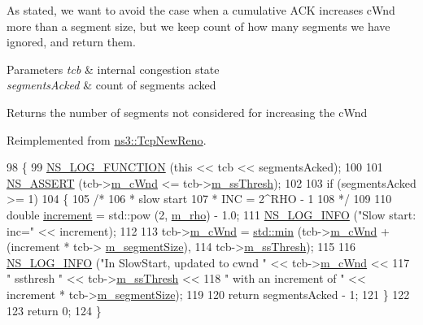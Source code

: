 As stated, we want to avoid the case when a cumulative A\+CK increases c\+Wnd more than a segment size, but we keep count of how many segments we have ignored, and return them.


\begin{DoxyParams}{Parameters}
{\em tcb} & internal congestion state \\
\hline
{\em segments\+Acked} & count of segments acked \\
\hline
\end{DoxyParams}
\begin{DoxyReturn}{Returns}
the number of segments not considered for increasing the c\+Wnd 
\end{DoxyReturn}


Reimplemented from \hyperlink{classns3_1_1TcpNewReno_a1cf5fd9585eb3b745727f4f5beae0706}{ns3\+::\+Tcp\+New\+Reno}.


\begin{DoxyCode}
98 \{
99   \hyperlink{log-macros-disabled_8h_a90b90d5bad1f39cb1b64923ea94c0761}{NS\_LOG\_FUNCTION} (\textcolor{keyword}{this} << tcb << segmentsAcked);
100 
101   \hyperlink{assert_8h_a6dccdb0de9b252f60088ce281c49d052}{NS\_ASSERT} (tcb->\hyperlink{classns3_1_1TcpSocketState_a7cd3d2156a483c1db436097477a0fd7f}{m\_cWnd} <= tcb->\hyperlink{classns3_1_1TcpSocketState_aec003b6dba9d269bfb1036c7652ffbd6}{m\_ssThresh});
102 
103   \textcolor{keywordflow}{if} (segmentsAcked >= 1)
104     \{
105       \textcolor{comment}{/*}
106 \textcolor{comment}{       * slow start}
107 \textcolor{comment}{       * INC = 2^RHO - 1}
108 \textcolor{comment}{       */}
109 
110       \textcolor{keywordtype}{double} \hyperlink{mmwave-amc-test2_8cc_ac504dff76b24ab9f15536c51aec9fbbb}{increment} = std::pow (2, \hyperlink{classns3_1_1TcpHybla_a89505ef8588ef3cbe7d19422cd8e1c78}{m\_rho}) - 1.0;
111       \hyperlink{group__logging_gafbd73ee2cf9f26b319f49086d8e860fb}{NS\_LOG\_INFO} (\textcolor{stringliteral}{"Slow start: inc="} << increment);
112 
113       tcb->\hyperlink{classns3_1_1TcpSocketState_a7cd3d2156a483c1db436097477a0fd7f}{m\_cWnd} = \hyperlink{80211b_8c_ac6afabdc09a49a433ee19d8a9486056d}{std::min} (tcb->\hyperlink{classns3_1_1TcpSocketState_a7cd3d2156a483c1db436097477a0fd7f}{m\_cWnd} + (increment * tcb->
      \hyperlink{classns3_1_1TcpSocketState_a079872f7b0099ef5f3cab4ff47bd2edd}{m\_segmentSize}),
114                               tcb->\hyperlink{classns3_1_1TcpSocketState_aec003b6dba9d269bfb1036c7652ffbd6}{m\_ssThresh});
115 
116       \hyperlink{group__logging_gafbd73ee2cf9f26b319f49086d8e860fb}{NS\_LOG\_INFO} (\textcolor{stringliteral}{"In SlowStart, updated to cwnd "} << tcb->\hyperlink{classns3_1_1TcpSocketState_a7cd3d2156a483c1db436097477a0fd7f}{m\_cWnd} <<
117                    \textcolor{stringliteral}{" ssthresh "} << tcb->\hyperlink{classns3_1_1TcpSocketState_aec003b6dba9d269bfb1036c7652ffbd6}{m\_ssThresh} <<
118                    \textcolor{stringliteral}{" with an increment of "} << increment * tcb->\hyperlink{classns3_1_1TcpSocketState_a079872f7b0099ef5f3cab4ff47bd2edd}{m\_segmentSize});
119 
120       \textcolor{keywordflow}{return} segmentsAcked - 1;
121     \}
122 
123   \textcolor{keywordflow}{return} 0;
124 \}
\end{DoxyCode}


